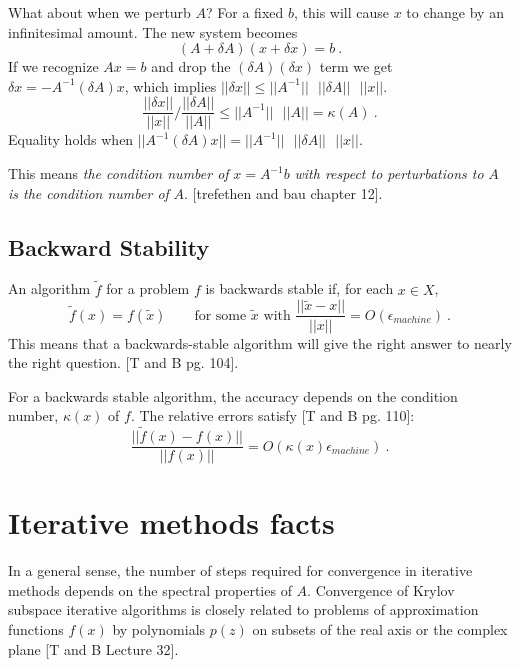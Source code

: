 \documentclass[12pt,twoside]{book}
\begin{document}
What about when we perturb $A$? For a fixed $b$, this will cause $x$ to change by an infinitesimal amount. The new system becomes
%
\begin{equation}
  (A + \delta A)(x + \delta x) = b \:.
\end{equation}
%
If we recognize $Ax = b$ and drop the $(\delta A)(\delta x)$ term we get $\delta x = -A^{-1}(\delta A) x$, which implies $||\delta x|| \le ||A^{-1}||\text{ } ||\delta A|| \text{ }||x||$.
\begin{equation}
  \frac{||\delta x||}{||x||} / \frac{||\delta A||}{||A||} \le ||A^{-1}|| \text{ }||A|| = \kappa(A) \:.
\end{equation}
%
Equality holds when $||A^{-1}(\delta A) x|| = ||A^{-1}|| \text{ }||\delta A||\text{ } ||x||$. 

This means \emph{the condition number of} $x=A^{-1}b$ \emph{with respect to perturbations to} $A$ \emph{is the condition number of} $A$. [trefethen and bau chapter 12].

\subsection{Backward Stability}
An algorithm $\tilde{f}$ for a problem $f$ is backwards stable if, for each $x \in X$,
%
\begin{equation}
  \tilde{f}(x) = f(\tilde{x}) \qquad \text{for some } \tilde{x} \text{ with } \frac{||\tilde{x} - x||}{||x||} = O(\epsilon _{machine}) \:.
\end{equation}
%
This means that a backwards-stable algorithm will give the right answer to nearly the right question. [T and B pg. 104].

For a backwards stable algorithm, the accuracy depends on the condition number, $\kappa(x)$ of $f$. The relative errors satisfy [T and B pg. 110]:
%
\begin{equation}
  \frac{||\tilde{f}(x) - f(x)||}{||f(x)||} = O(\kappa(x) \epsilon _{machine}) \:.
\end{equation}
%

\section{Iterative methods facts}
In a general sense, the number of steps required for convergence in iterative methods depends on the spectral properties of $A$. Convergence of Krylov subspace iterative algorithms is closely related to problems of approximation functions $f(x)$ by polynomials $p(z)$ on subsets of the real axis or the complex plane [T and B Lecture 32].
\end{document}
